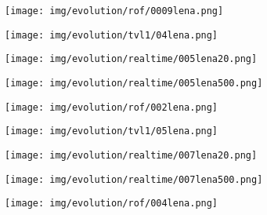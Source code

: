\begin{figure}[ht]
\begin{center}
\begin{subfigure}[b]{0.19\textwidth}
            \texttt{[image: img/evolution/rof/0009lena.png]}
        \end{subfigure}
        \begin{subfigure}[b]{0.19\textwidth}
            \texttt{[image: img/evolution/tvl1/04lena.png]}
        \end{subfigure}
        \begin{subfigure}[b]{0.19\textwidth}
            \texttt{[image: img/evolution/realtime/005lena20.png]}
        \end{subfigure}
        \begin{subfigure}[b]{0.19\textwidth}
            \texttt{[image: img/evolution/realtime/005lena500.png]}
        \end{subfigure}
    \end{center}
    \begin{center}
        \begin{subfigure}[b]{0.19\textwidth}
            \texttt{[image: img/evolution/rof/002lena.png]}
        \end{subfigure}
        \begin{subfigure}[b]{0.19\textwidth}
            \texttt{[image: img/evolution/tvl1/05lena.png]}
        \end{subfigure}
        \begin{subfigure}[b]{0.19\textwidth}
            \texttt{[image: img/evolution/realtime/007lena20.png]}
        \end{subfigure}
        \begin{subfigure}[b]{0.19\textwidth}
            \texttt{[image: img/evolution/realtime/007lena500.png]}
        \end{subfigure}
    \end{center}
    \begin{center}
        \begin{subfigure}[b]{0.19\textwidth}
            \texttt{[image: img/evolution/rof/004lena.png]}
        \end{subfigure}
        \begin{subfigure}[b]{0.19\textwidth}

\end{subfigure}
\end{center}
\end{figure}
